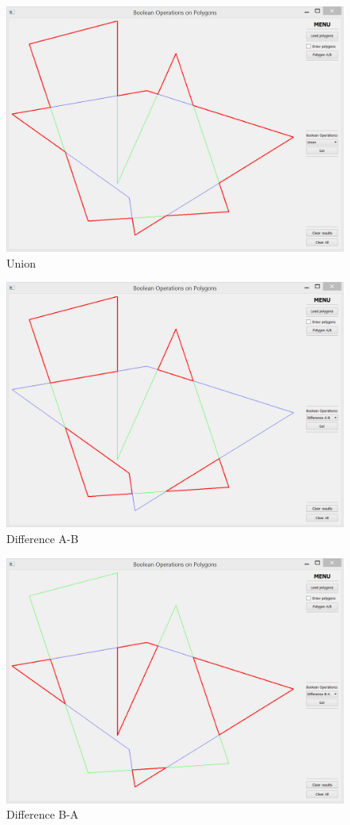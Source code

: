 \documentclass[a4paper, 12pt]{article}
\begin{document}
\begin{figure}[h]
	\centering
	\includegraphics[width=12cm]{union.jpg}
	\caption{Union}
\end{figure}

\begin{figure}[h]
	\centering
	\includegraphics[width=12cm]{A-B.jpg}
	\caption{Difference A-B}
\end{figure}


\begin{figure}[h]
	\centering
	\includegraphics[width=12cm]{B-A.jpg}
	\caption{Difference B-A}
\end{figure}
\end{document}
